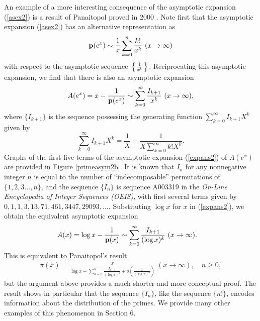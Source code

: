 \documentclass[12pt]{article}
\begin{document}

An example of a more interesting consequence of the asymptotic expansion  (\ref{asex2}) is  a result of Panaitopol proved in 2000 \cite[Theorem]{pan}.  Note first that the asymptotic expansion  (\ref{asex2}) has an alternative representation as
$${\mathbf p}(e^x) \sim \frac{1}{x} \sum_{k = 0}^n {\frac {k!}{x^{k}}} \ (x \to \infty)$$
with respect to the asymptotic sequence $\left\{ \frac{1}{x^k}\right\}$.
Reciprocating this asymptotic expansion, we find that there is also an asymptotic expansion
\begin{align}\label{expans2}
A(e^x) = x- \frac{1}{{\mathbf p}(e^x)}\sim \sum_{k = 0}^\infty {\frac {I_{k+1}}{x^{k}}} \ (x \to \infty),
\end{align}
where $\{I_{k+1}\}$ is the sequence possessing the generating function $\sum_{k = 0}^\infty I_{k+1}X^k$ given by
$$\sum_{k = 0}^\infty I_{k+1}X^k = \frac{1}{X}-\frac{1}{X\sum_{k = 0}^\infty k!X^k} .$$  Graphs of the first five terms of the asymptotic expansion (\ref{expans2}) of $A(e^x)$ are provided in  Figure \ref{primeasym2b}.   It is known that $I_n$ for any nonnegative integer $n$ is equal to the number of ``indecomposable'' permutations of $\{1,2,3\ldots, n\}$, and the sequence $\{I_n\}$ is sequence A003319 in the {\it On-Line Encyclopedia of Integer Sequences (OEIS)}, with first several terms given by  $0, 1, 1, 3, 13, 71, 461, 3447, 29093, \ldots$.  Substituting  $\log x$ for $x$ in  (\ref{expans2}), we obtain the equivalent asymptotic expansion 
\begin{align}\label{Axsym}
A(x) = \log x - \frac{1}{{\mathbf p}(x)} & \sim \sum_{k = 0}^{\infty} \frac{I_{k+1}}{(\log x)^{k}} \ (x \to \infty).
\end{align}
This is equivalent to Panaitopol's result \cite[Theorem]{pan}
\begin{align*}
\pi(x) = \frac{x}{\log x - \sum_{k = 0}^{n} \frac{I_{k+1}}{(\log x)^{k}} + o \left( \frac{1}{(\log x)^{n}} \right)}  \ (x \to \infty), \quad n \geq 0,
\end{align*}
but the argument above provides a much shorter and more conceptual proof.   The result shows in particular that the sequence $\{I_n\}$, like the sequence $\{n!\}$, encodes information about the distribution of the primes.  We provide many other examples of this phenomenon in Section 6.   
\end{document}
